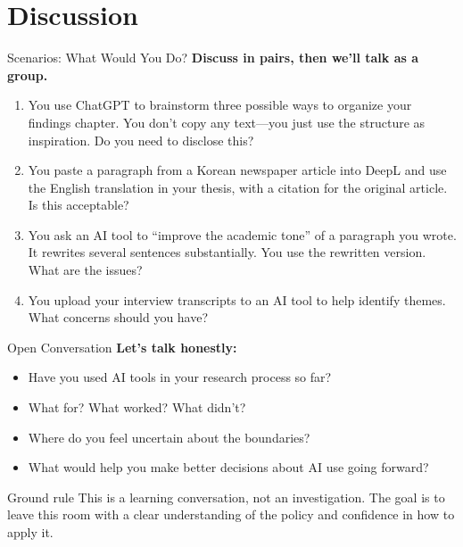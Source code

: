 \documentclass[aspectratio=169,11pt]{beamer}
\begin{document}
\section{Discussion}

\begin{frame}{Scenarios: What Would You Do?}
    \textbf{Discuss in pairs, then we'll talk as a group.}
    \vspace{0.3cm}
    \begin{enumerate}
        \item You use ChatGPT to brainstorm three possible ways to organize your findings chapter. You don't copy any text---you just use the structure as inspiration. Do you need to disclose this?
        \vspace{0.2cm}
        \item You paste a paragraph from a Korean newspaper article into DeepL and use the English translation in your thesis, with a citation for the original article. Is this acceptable?
        \vspace{0.2cm}
        \item You ask an AI tool to ``improve the academic tone'' of a paragraph you wrote. It rewrites several sentences substantially. You use the rewritten version. What are the issues?
        \vspace{0.2cm}
        \item You upload your interview transcripts to an AI tool to help identify themes. What concerns should you have?
    \end{enumerate}
\end{frame}

\begin{frame}{Open Conversation}
    \textbf{Let's talk honestly:}
    \vspace{0.5cm}
    \begin{itemize}
        \item Have you used AI tools in your research process so far?
        \item What for? What worked? What didn't?
        \item Where do you feel uncertain about the boundaries?
        \item What would help you make better decisions about AI use going forward?
    \end{itemize}
    \vspace{0.5cm}
    \begin{block}{Ground rule}
        This is a learning conversation, not an investigation. The goal is to leave this room with a clear understanding of the policy and confidence in how to apply it.
    \end{block}
\end{frame}
\end{document}
